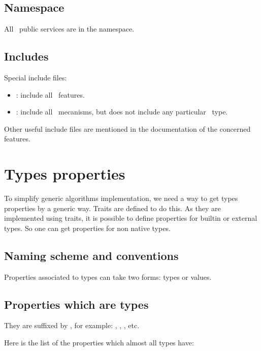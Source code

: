 \subsection{Namespace}

All \integre\ public services are in the  namespace.

\subsection{Includes}

Special include files:

\begin{itemize}
  \item {}: include all \integre\ features.

  \item {}: include all \integre\ mecanisms, but
  does not include any particular \integre\ type.
\end{itemize}

Other useful include files are mentioned in the documentation of the
concerned features.


\section{Types properties}

To simplify generic algorithms implementation, we need a way to get
types properties by a generic way. Traits are defined to do this. As
they are implemented using traits, it is possible to define properties
for builtin or external types. So one can get properties for non
{\integre} native types.

\subsection{Naming scheme and conventions}

Properties associated to types can take two forms: types or values.

\subsection{Properties which are types}

They are suffixed by , for example: ,
, , etc.

Here is the list of the properties which almost all types have:

